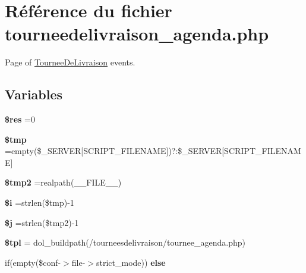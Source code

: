 \hypertarget{tourneedelivraison__agenda_8php}{}\section{Référence du fichier tourneedelivraison\+\_\+agenda.\+php}
\label{tourneedelivraison__agenda_8php}


Page of \hyperlink{classTourneeDeLivraison}{Tournee\+De\+Livraison} events.  


\subsection*{Variables}
\begin{DoxyCompactItemize}
\item 
\mbox{\label{tourneedelivraison__agenda_8php_a49a8a4009b02e49717caa88b128affc5}} 
{\bfseries \$res} =0
\item 
\mbox{\label{tourneedelivraison__agenda_8php_a57024d47cf8348153f5fdda16f8fefa9}} 
{\bfseries \$tmp} =empty(\$\+\_\+\+S\+E\+R\+V\+ER\mbox{[}\textquotesingle{}S\+C\+R\+I\+P\+T\+\_\+\+F\+I\+L\+E\+N\+A\+ME\textquotesingle{}\mbox{]})?\textquotesingle{}\textquotesingle{}\+:\$\+\_\+\+S\+E\+R\+V\+ER\mbox{[}\textquotesingle{}S\+C\+R\+I\+P\+T\+\_\+\+F\+I\+L\+E\+N\+A\+ME\textquotesingle{}\mbox{]}
\item 
\mbox{\label{tourneedelivraison__agenda_8php_aed9bcb6730d1510376ce80e32bd9504d}} 
{\bfseries \$tmp2} =realpath(\+\_\+\+\_\+\+F\+I\+L\+E\+\_\+\+\_\+)
\item 
\mbox{\label{tourneedelivraison__agenda_8php_a83018d9153d17d91fbcf3bc10158d34f}} 
{\bfseries \$i} =strlen(\$tmp)-\/1
\item 
\mbox{\label{tourneedelivraison__agenda_8php_a6f16db779ef3ccea921b277b5dc245d1}} 
{\bfseries \$j} =strlen(\$tmp2)-\/1
\item 
\mbox{\label{tourneedelivraison__agenda_8php_a04b1944cdb09f9a4e290cde7a12499e6}} 
{\bfseries \$tpl} = dol\+\_\+buildpath(\textquotesingle{}/tourneesdelivraison/tournee\+\_\+agenda.\+php\textquotesingle{})
\item 
if(empty(\$conf-\/$>$file-\/$>$strict\+\_\+mode)) {\bfseries else}
\end{DoxyCompactItemize}


